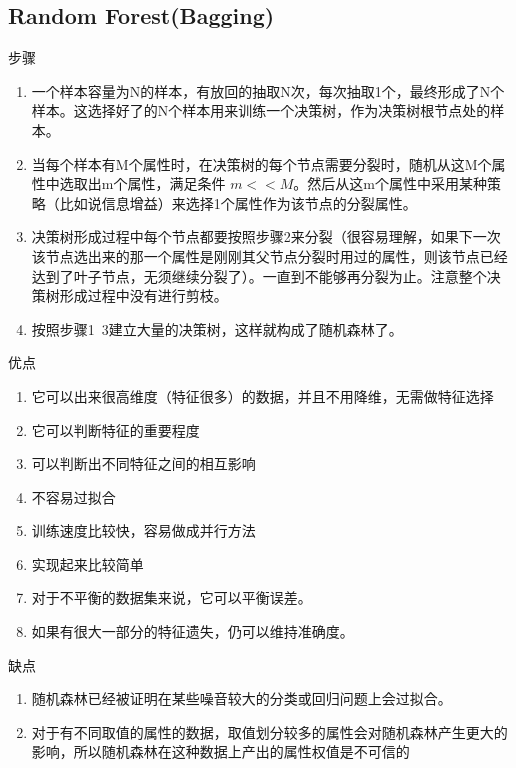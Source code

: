 \documentclass[12pt]{article}
\numberwithin{theorem}{section} %
\numberwithin{definition}{section} %
\numberwithin{assumption}{section} %
\numberwithin{lemma}{section} %
\numberwithin{remark}{section} %
\numberwithin{prop}{section} %
\numberwithin{corollary}{section} %
\numberwithin{example}{section} %
\numberwithin{question}{section} %
\numberwithin{problem}{section} %
\numberwithin{conjecture}{section} %
\numberwithin{append}{section} %
\numberwithin{property}{section} %
\begin{document}
\begin{CJK}{UTF8}{gbsn}
\subsection{Random Forest(Bagging)}
步骤
\begin{enumerate}
	\item 一个样本容量为N的样本，有放回的抽取N次，每次抽取1个，最终形成了N个样本。这选择好了的N个样本用来训练一个决策树，作为决策树根节点处的样本。
	\item 当每个样本有M个属性时，在决策树的每个节点需要分裂时，随机从这M个属性中选取出m个属性，满足条件 $m<<M$。然后从这m个属性中采用某种策略（比如说信息增益）来选择1个属性作为该节点的分裂属性。
	\item 决策树形成过程中每个节点都要按照步骤2来分裂（很容易理解，如果下一次该节点选出来的那一个属性是刚刚其父节点分裂时用过的属性，则该节点已经达到了叶子节点，无须继续分裂了）。一直到不能够再分裂为止。注意整个决策树形成过程中没有进行剪枝。
	\item 按照步骤1~3建立大量的决策树，这样就构成了随机森林了。
\end{enumerate}
优点
\begin{enumerate}
	\item 它可以出来很高维度（特征很多）的数据，并且不用降维，无需做特征选择
	\item 它可以判断特征的重要程度
	\item 可以判断出不同特征之间的相互影响
	\item 不容易过拟合
	\item 训练速度比较快，容易做成并行方法
	\item 实现起来比较简单
	\item 对于不平衡的数据集来说，它可以平衡误差。
	\item 如果有很大一部分的特征遗失，仍可以维持准确度。
\end{enumerate}

缺点
\begin{enumerate}
	\item 随机森林已经被证明在某些噪音较大的分类或回归问题上会过拟合。
	\item 对于有不同取值的属性的数据，取值划分较多的属性会对随机森林产生更大的影响，所以随机森林在这种数据上产出的属性权值是不可信的
\end{enumerate}


\end{CJK}
\end{document}
